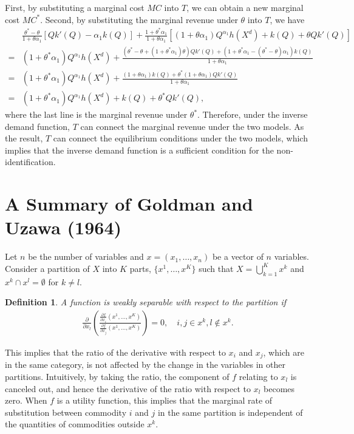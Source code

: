 \documentclass[11pt, a4paper]{article}
\newtheorem{definition}{Definition}
\theoremstyle{remark}
\begin{document}
First, by substituting a marginal cost $MC$ into $T$, we can obtain a new marginal cost $MC^{*}$.
Second, by substituting the marginal revenue under $\theta$ into $T$, we have
\begin{align}
    & \frac{\theta^{*} - \theta}{1 + \theta\alpha_1} \left[Qk'(Q) - \alpha_1k(Q) \right] + \frac{1 + \theta^{*}\alpha_1}{1 + \theta\alpha_1} \left[(1+\theta\alpha_1) Q^{\alpha_1}h(X^{d}) + k(Q) + \theta Qk'(Q)\right]\\
    = & (1 + \theta^{*}\alpha_1)Q^{\alpha_1}h(X^{d}) + \frac{(\theta^{*} - \theta + (1 + \theta^{*}\alpha_1)\theta)Qk'(Q) + (1 + \theta^{*}\alpha_1 - (\theta^{*} - \theta)\alpha_1) k(Q)}{1 + \theta\alpha_1}\\
    = & (1 + \theta^{*}\alpha_1)Q^{\alpha_1}h(X^{d}) + \frac{(1 + \theta\alpha_1) k(Q) + \theta^{*}(1 + \theta\alpha_1)Qk'(Q) }{1 + \theta\alpha_1}\\
    = & (1 + \theta^{*}\alpha_1)Q^{\alpha_1}h(X^{d}) +k(Q) + \theta^{*}Qk'(Q),
\end{align}
where the last line is the marginal revenue under $\theta^{*}$.
Therefore, under the inverse demand function, $T$ can connect the marginal revenue under the two models.
As the result, $T$ can connect the equilibrium conditions under the two models, which implies that the inverse demand function is a sufficient condition for the non-identification.



\section{A Summary of Goldman and Uzawa (1964)}\label{appendix:summary_goldman_uzawa}

Let $n$ be the number of variables and $x = (x_{1},\ldots, x_{n})$ be a vector of $n$ variables.
Consider a partition of $X$ into $K$ parts, $\{x^1, \ldots, x^K\}$ such that $X = \bigcup_{k=1}^K x^k$ and $x^k \cap x^l = \emptyset$ for $k\ne l$.
\begin{definition}\label{def:weal_separable}
    A function is weakly separable with respect to the partition if 
    \begin{align}
        \frac{\partial}{\partial x_l}\left(\frac{\frac{\partial f}{\partial x_i}(x^1, \ldots, x^K)}{\frac{\partial f}{\partial x_j}(x^1, \ldots, x^K)}\right) = 0, \quad i,j\in x^k, l \notin x^k.
    \end{align}
\end{definition}
This implies that the ratio of the derivative with respect to $x_i$ and $x_j$, which are in the same category, is not affected by the change in the variables in other partitions.
Intuitively, by taking the ratio, the component of $f$ relating to $x_l$ is canceled out, and hence the derivative of the ratio with respect to $x_l$ becomes zero.
When $f$ is a utility function, this implies that the marginal rate of substitution between commodity $i$ and $j$ in the same partition is independent of the quantities of commodities outside $x^k$.
\end{document}
